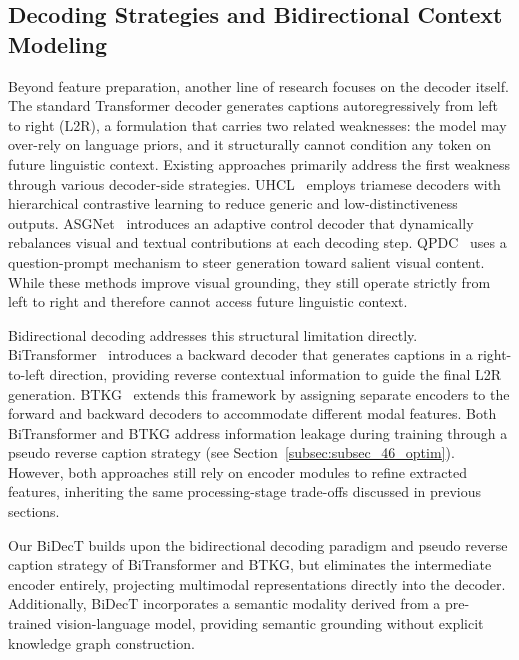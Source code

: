 \subsection{Decoding Strategies and Bidirectional Context Modeling}
\label{subsec:subsec_23_decoding}
Beyond feature preparation, another line of research focuses on the decoder itself. The standard Transformer decoder generates captions autoregressively from left to right (L2R), a formulation that carries two related weaknesses: the model may over-rely on language priors, and it structurally cannot condition any token on future linguistic context. Existing approaches primarily address the first weakness through various decoder-side strategies. UHCL~\cite{sunUnifiedHierarchicalContrastive2026} employs triamese decoders with hierarchical contrastive learning to reduce generic and low-distinctiveness outputs. ASGNet~\cite{liuAdaptiveSemanticGuidance2025} introduces an adaptive control decoder that dynamically rebalances visual and textual contributions at each decoding step. QPDC~\cite{chenAskFocusMore2026} uses a question-prompt mechanism to steer generation toward salient visual content. While these methods improve visual grounding, they still operate strictly from left to right and therefore cannot access future linguistic context.

Bidirectional decoding addresses this structural limitation directly. BiTransformer~\cite{zhongBiTransformerAugmentingSemantic2022} introduces a backward decoder that generates captions in a right-to-left direction, providing reverse contextual information to guide the final L2R generation. BTKG~\cite{zhongBidirectionalTransformerKnowledge2024} extends this framework by assigning separate encoders to the forward and backward decoders to accommodate different modal features. Both BiTransformer and BTKG address information leakage during training through a pseudo reverse caption strategy (see Section~\ref{subsec:subsec_46_optim}). However, both approaches still rely on encoder modules to refine extracted features, inheriting the same processing-stage trade-offs discussed in previous sections.

Our BiDecT builds upon the bidirectional decoding paradigm and pseudo reverse caption strategy of BiTransformer and BTKG, but eliminates the intermediate encoder entirely, projecting multimodal representations directly into the decoder. Additionally, BiDecT incorporates a semantic modality derived from a pre-trained vision-language model, providing semantic grounding without explicit knowledge graph construction.
